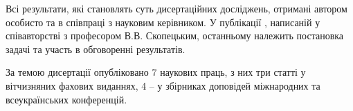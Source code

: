 {\contribution} Всі результати, які становлять суть  дисертаційних досліджень, отримані автором особисто та в співпраці
з науковим керівником. У публікації \cite{kharkiv-2007}, написаній у співавторстві з професором В.В. Скопецьким, останньому
належить постановка задачі та участь в обговоренні результатів.

{\publications} За темою дисертації опубліковано 7 наукових праць, з них три статті у вітчизняних фахових виданнях,
4 – у збірниках доповідей міжнародних та всеукраїнських конференцій.
